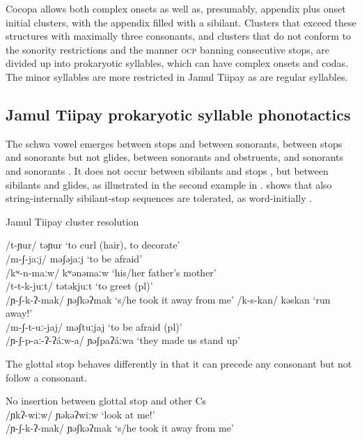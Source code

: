 \documentclass[output=paper,colorlinks,citecolor=brown]{langscibook}
\begin{document}
Cocopa allows both complex onsets as well as, presumably, appendix plus onset initial clusters, with the appendix filled with a sibilant. Clusters that exceed these structures with maximally three consonants, and clusters that do not conform to the sonority restrictions and the manner \textsc{ocp} banning consecutive stops, are divided up into prokaryotic syllables, which can have complex onsets and codas. The minor syllables are more restricted in Jamul Tiipay as are regular syllables.

\subsection{Jamul Tiipay prokaryotic syllable phonotactics}\label{jamul}
The schwa vowel emerges between stops and between sonorants, between stops and sonorants but not glides, between sonorants and obstruents, and sonorants and sonorants . It does not occur between sibilants and stops , but between sibilants and glides, as illustrated in the second example in .  shows that also string-internally sibilant-stop sequences are tolerated, as word-initially .

\begin{exe}
    \ex \label{ex14} Jamul Tiipay cluster resolution
    \begin{xlist}
        \ex \label{ex14a} /t-ɲur/    \tab       təɲur   \tab      ‘to curl (hair), to decorate’\\
        /m-ʃ{}-jaːj/   \tab     məʃəjaːj   \tab   ‘to be afraid’\\
        /kʷ{}-n-maːw/  \tab    kʷənəmaːw  \tab  ‘his/her father's mother’\\
        /t-t-k-juːt/   \tab     tətəkjuːt  \tab    ‘to greet (pl)’\\
        /ɲ-ʃ{}-k-ʔ{}-mak/    \tab  ɲəʃkəʔmak  \tab  ‘s/he took it away from me’
        \ex \label{ex14b} /k-s-kan/    \tab     kəskan    \tab  ‘run away!’\\
        /m-ʃ{}-t-uː-jaj/  \tab     məʃtuːjaj \tab   ‘to be afraid (pl)’\\
        /ɲ{}-ʃ{}-p-aː{}-ʔ{}-ʔáːw-a/  \tab ɲəʃpaʔáːwa \tab ‘they made us stand up’
    \end{xlist}
\end{exe}

The glottal stop behaves differently in that it can precede any consonant but not follow a consonant.

\begin{exe}
    \ex \label{ex15} No insertion between glottal stop and other Cs\\
    /ɲkʔ-wiːw/   \tab      ɲəkəʔwiːw \tab   ‘look at me!’\\
    /ɲ-ʃ{}-k-ʔ{}-mak/   \tab    ɲəʃkəʔmak  \tab  ‘s/he took it away from me’
\end{exe}
\end{document}
